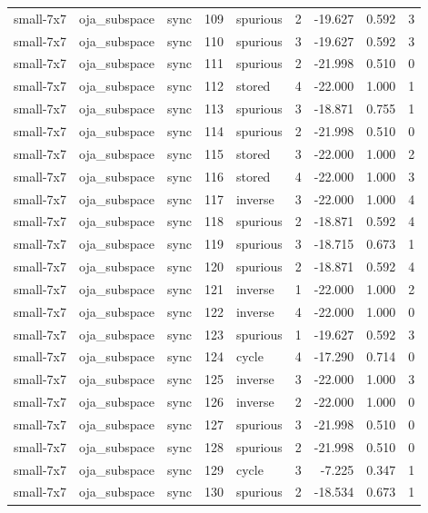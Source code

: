\begin{tabular}{lllrlrrrr}
small-7x7 & oja\_subspace & sync & 109 & spurious & 2 & -19.627 & 0.592 & 3 \\
small-7x7 & oja\_subspace & sync & 110 & spurious & 3 & -19.627 & 0.592 & 3 \\
small-7x7 & oja\_subspace & sync & 111 & spurious & 2 & -21.998 & 0.510 & 0 \\
small-7x7 & oja\_subspace & sync & 112 & stored & 4 & -22.000 & 1.000 & 1 \\
small-7x7 & oja\_subspace & sync & 113 & spurious & 3 & -18.871 & 0.755 & 1 \\
small-7x7 & oja\_subspace & sync & 114 & spurious & 2 & -21.998 & 0.510 & 0 \\
small-7x7 & oja\_subspace & sync & 115 & stored & 3 & -22.000 & 1.000 & 2 \\
small-7x7 & oja\_subspace & sync & 116 & stored & 4 & -22.000 & 1.000 & 3 \\
small-7x7 & oja\_subspace & sync & 117 & inverse & 3 & -22.000 & 1.000 & 4 \\
small-7x7 & oja\_subspace & sync & 118 & spurious & 2 & -18.871 & 0.592 & 4 \\
small-7x7 & oja\_subspace & sync & 119 & spurious & 3 & -18.715 & 0.673 & 1 \\
small-7x7 & oja\_subspace & sync & 120 & spurious & 2 & -18.871 & 0.592 & 4 \\
small-7x7 & oja\_subspace & sync & 121 & inverse & 1 & -22.000 & 1.000 & 2 \\
small-7x7 & oja\_subspace & sync & 122 & inverse & 4 & -22.000 & 1.000 & 0 \\
small-7x7 & oja\_subspace & sync & 123 & spurious & 1 & -19.627 & 0.592 & 3 \\
small-7x7 & oja\_subspace & sync & 124 & cycle & 4 & -17.290 & 0.714 & 0 \\
small-7x7 & oja\_subspace & sync & 125 & inverse & 3 & -22.000 & 1.000 & 3 \\
small-7x7 & oja\_subspace & sync & 126 & inverse & 2 & -22.000 & 1.000 & 0 \\
small-7x7 & oja\_subspace & sync & 127 & spurious & 3 & -21.998 & 0.510 & 0 \\
small-7x7 & oja\_subspace & sync & 128 & spurious & 2 & -21.998 & 0.510 & 0 \\
small-7x7 & oja\_subspace & sync & 129 & cycle & 3 & -7.225 & 0.347 & 1 \\
small-7x7 & oja\_subspace & sync & 130 & spurious & 2 & -18.534 & 0.673 & 1 \\

\end{tabular}
